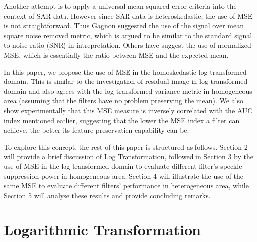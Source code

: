 \documentclass[journal]{IEEEtran}
\begin{document}
Another attempt is to apply a universal mean squared error criteria into the context of SAR data. However since SAR data is heteroskedastic, the use of MSE is not straightforward. Thus Gagnon suggested the use of the signal over mean square noise removed metric, which is argued to be similar to the standard signal to noise ratio (SNR) in intrepretation. Others have suggest the use of normalized MSE, which is essentially the ratio between MSE and the expected mean.

In this paper, we propose the use of MSE in the homoskedastic log-transformed domain. This is similar to the investigation of residual image in log-transformed domain and also agrees with the log-transformed variance metric in homogeneous area (assuming that the filters have no problem preserving the mean). We also show experimentally that this MSE measure is inversely correlated with the AUC index mentioned earlier, suggesting that the lower the MSE index a filter can achieve, the better its feature preservation capability can be.

To explore this concept, the rest of this paper is structured as follows.
Section 2 will provide a brief discussion of Log Transformation, followed in Section 3 by the use of MSE in the log-transformed domain to evaluate different filter's speckle suppression power in homogeneous area.
Section 4 will illustrate the use of the same MSE to evaluate different filters' performance in heterogeneous area, while Section 5 will analyse these results and provide concluding remarks.

\section{Logarithmic Transformation}



\end{document}
